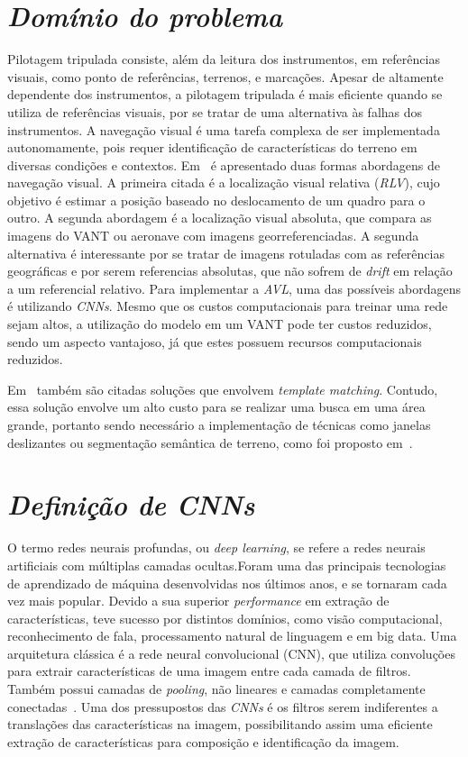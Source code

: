 

\section{\textit{Domínio do problema}}\label{sec:Cap2_MR}

Pilotagem tripulada consiste, além da leitura dos instrumentos, em referências visuais, como ponto de referências, terrenos, e marcações. Apesar de altamente dependente dos instrumentos, a pilotagem tripulada é mais eficiente quando se utiliza de referências visuais, por se tratar de uma alternativa às falhas dos instrumentos. A navegação visual é uma tarefa complexa de ser implementada autonomamente, pois requer identificação de características do terreno em diversas condições e contextos. Em~\cite{COUTURIER2021103666} é apresentado duas formas abordagens de navegação visual. A primeira citada é a localização visual relativa (\textit{RLV}), cujo objetivo é estimar a posição baseado no deslocamento de um quadro para o outro. A segunda abordagem é a localização visual absoluta, que compara as imagens do VANT ou aeronave com imagens georreferenciadas. A segunda alternativa é interessante por se tratar de imagens rotuladas com as referências geográficas e por serem referencias absolutas, que não sofrem de \textit{drift} em relação a um referencial relativo. Para implementar a \textit{AVL}, uma das possíveis abordagens é utilizando \textit{CNNs}. Mesmo que os custos computacionais para treinar uma rede sejam altos, a utilização do modelo em um VANT pode ter custos reduzidos, sendo um aspecto vantajoso, já que estes possuem recursos computacionais reduzidos.

Em~\cite{COUTURIER2021103666} também são citadas soluções que envolvem \textit{template matching}. Contudo, essa solução envolve um alto custo para se realizar uma busca em uma área grande, portanto sendo  necessário a implementação de técnicas como janelas deslizantes ou segmentação semântica de terreno, como foi proposto em~\cite{9552597}. 

\section{\textit{Definição de CNNs}}\label{sec:Cap2_MR}

O termo redes neurais profundas, ou \textit{deep learning}, se refere a redes neurais artificiais com múltiplas camadas ocultas.Foram uma das principais tecnologias de aprendizado de máquina desenvolvidas nos últimos anos, e se tornaram cada vez mais popular. Devido a sua superior \textit{performance} em extração de características, teve sucesso por distintos domínios, como visão computacional, reconhecimento de fala, processamento natural de linguagem e em big data. Uma arquitetura clássica é a rede neural convolucional (CNN), que utiliza convoluções para extrair características de uma imagem entre cada camada de filtros. Também possui camadas de \textit{pooling}, não lineares e camadas completamente conectadas~\cite{8308186}. Uma dos pressupostos das \textit{CNNs} é os filtros serem indiferentes a translações das características na imagem, possibilitando assim uma eficiente extração de características para composição e identificação da imagem.

